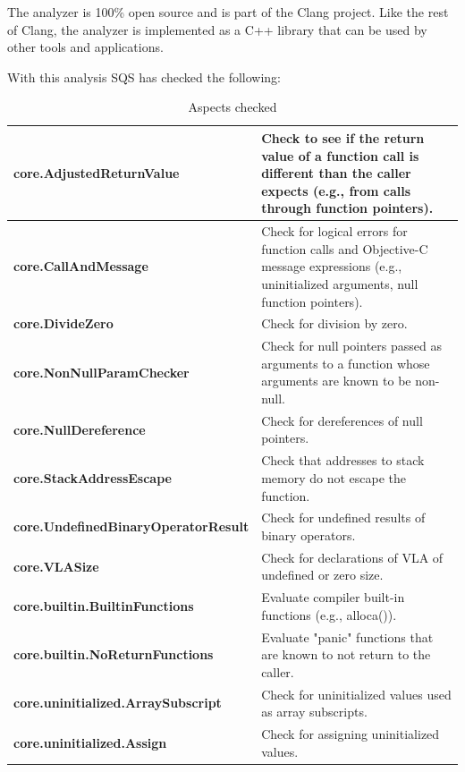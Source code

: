 The analyzer is 100\% open source and is part of the Clang project. Like the rest of Clang, the analyzer is implemented as a C++ library that can be used by other tools and applications.

With this analysis SQS has checked the following:

{\footnotesize\sffamily\centering
  \begin{longtable}{||p{}|p{}||}
  \caption{Aspects checked}\\
    \hline\hline
    \hline\hline
    \endhead
    \hline\hline
    \endfoot
    \textbf{core.AdjustedReturnValue}
& Check to see if the return value of a function call is different than the caller expects (e.g., from calls through function pointers).
    \\
    \hline
    \textbf{core.CallAndMessage}
& Check for logical errors for function calls and Objective-C message expressions (e.g., uninitialized arguments, null function pointers).
    \\
    \hline
    \textbf{core.DivideZero}
& Check for division by zero.
    \\
    \hline
    \textbf{core.NonNullParamChecker}
& Check for null pointers passed as arguments to a function whose arguments are known to be non-null.
    \\
    \hline
    \textbf{core.NullDereference}
& Check for dereferences of null pointers.
    \\
    \hline
    \textbf{core.StackAddressEscape}
& Check that addresses to stack memory do not escape the function.
    \\
    \hline
    \textbf{core.UndefinedBinaryOperatorResult}
& Check for undefined results of binary operators.
    \\
    \hline
    \textbf{core.VLASize}
& Check for declarations of VLA of undefined or zero size.
    \\
    \hline
    \textbf{core.builtin.BuiltinFunctions}
& Evaluate compiler built-in functions (e.g., alloca()).
    \\
    \hline
    \textbf{core.builtin.NoReturnFunctions}
& Evaluate "panic" functions that are known to not return to the caller.
    \\
    \hline
    \textbf{core.uninitialized.ArraySubscript}
& Check for uninitialized values used as array subscripts.
    \\
    \hline
    \textbf{core.uninitialized.Assign}
& Check for assigning uninitialized values.
    \\

\end{longtable}}
